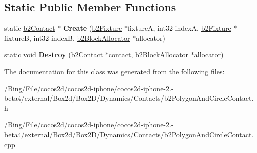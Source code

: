 \subsection*{Static Public Member Functions}
\begin{DoxyCompactItemize}
\item 
\hypertarget{classb2_polygon_and_circle_contact_a0b83e092a7d14f9cdd919fa15ef6058f}{static \hyperlink{classb2_contact}{b2\-Contact} $\ast$ {\bfseries Create} (\hyperlink{classb2_fixture}{b2\-Fixture} $\ast$fixture\-A, int32 index\-A, \hyperlink{classb2_fixture}{b2\-Fixture} $\ast$fixture\-B, int32 index\-B, \hyperlink{classb2_block_allocator}{b2\-Block\-Allocator} $\ast$allocator)}\label{classb2_polygon_and_circle_contact_a0b83e092a7d14f9cdd919fa15ef6058f}

\item 
\hypertarget{classb2_polygon_and_circle_contact_a04e9a3fcdcf52821fb90b8206b8bb2f0}{static void {\bfseries Destroy} (\hyperlink{classb2_contact}{b2\-Contact} $\ast$contact, \hyperlink{classb2_block_allocator}{b2\-Block\-Allocator} $\ast$allocator)}\label{classb2_polygon_and_circle_contact_a04e9a3fcdcf52821fb90b8206b8bb2f0}

\end{DoxyCompactItemize}


The documentation for this class was generated from the following files\-:\begin{DoxyCompactItemize}
\item 
/\-Bing/\-File/cocos2d/cocos2d-\/iphone/cocos2d-\/iphone-\/2.-\/beta4/external/\-Box2d/\-Box2\-D/\-Dynamics/\-Contacts/b2\-Polygon\-And\-Circle\-Contact.\-h\item 
/\-Bing/\-File/cocos2d/cocos2d-\/iphone/cocos2d-\/iphone-\/2.-\/beta4/external/\-Box2d/\-Box2\-D/\-Dynamics/\-Contacts/b2\-Polygon\-And\-Circle\-Contact.\-cpp\end{DoxyCompactItemize}

